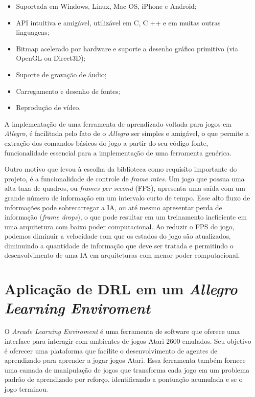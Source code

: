 \begin{itemize}
	\item Suportada em Windows, Linux, Mac OS, iPhone e Android;
	\item API intuitiva e amigável, utilizável em C, C ++ e em muitas outras linguagens;
	\item Bitmap acelerado por hardware e suporte a desenho gráfico primitivo (via OpenGL ou Direct3D);
	\item Suporte de gravação de áudio;
	\item Carregamento e desenho de fontes;
	\item Reprodução de vídeo.
\end{itemize}

A implementação de uma ferramenta de aprendizado voltada para jogos em \textit{Allegro}, é facilitada pelo fato de o \textit{Allegro} ser simples e amigável, o que permite a extração dos comandos básicos do jogo a partir do seu código fonte, funcionalidade essencial para a implementação de uma ferramenta genérica.

 Outro motivo que levou à escolha da biblioteca como requisito importante do projeto, é a funcionalidade de controle de \textit{frame rates}. Um jogo que possua uma alta taxa de quadros, ou \textit{frames per second} (FPS), apresenta uma saída com um grande número de informação em um intervalo curto de tempo. Esse alto fluxo de informações pode sobrecarregar a IA, ou até mesmo apresentar perda de informação (\textit{frame drops}), o que pode resultar em um treinamento ineficiente em uma arquitetura com baixo poder computacional. Ao reduzir o FPS do jogo, podemos diminuir a velocidade com que os estados do jogo são atualizados, diminuindo a quantidade de informação que deve ser tratada e permitindo o desenvolvimento de uma IA em arquiteturas com menor poder computacional.


\section{Aplicação de DRL em um \textit{Allegro Learning Enviroment}} %
 \label{sec:allegro_learning_enviroment}

 O \textit{Arcade Learning Enviroment} é uma ferramenta de software que oferece uma interface para interagir com ambientes de jogos Atari 2600 emulados. Seu objetivo é oferecer uma plataforma que facilite o desenvolvimento de agentes de aprendizado para aprender a jogar jogos Atari. Essa ferramenta também fornece uma camada de manipulação de jogos que
 transforma cada jogo em um problema padrão de aprendizado por reforço, identificando a pontuação acumulada e se o jogo terminou. \cite{arcade-learning-enviroment}

